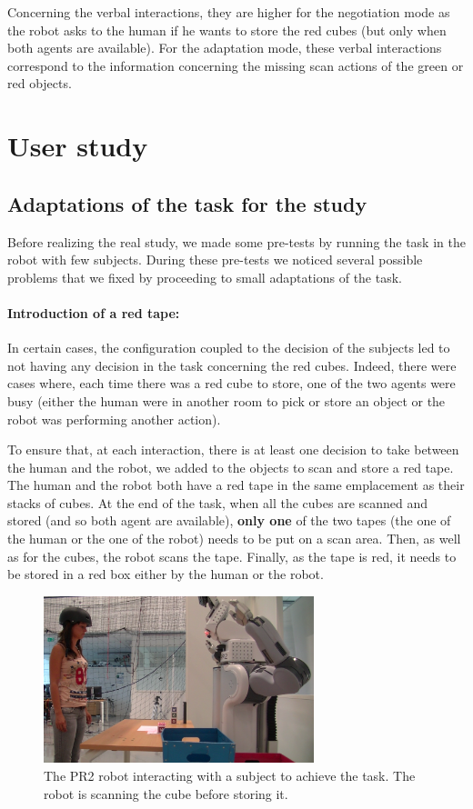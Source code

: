 \documentclass[english,a4paper,11pt,twoside]{StyleThese}
\begin{document}
Concerning the verbal interactions, they are higher for the negotiation mode as the robot asks to the human if he wants to store the red cubes (but only when both agents are available). For the adaptation mode, these verbal interactions correspond to the information concerning the missing scan actions of the green or red objects.

\section{User study}

\subsection{Adaptations of the task for the study}


Before realizing the real study, we made some pre-tests by running the task in the robot with few subjects. During these pre-tests we noticed several possible problems that we fixed by proceeding to small adaptations of the task.

\paragraph{Introduction of a red tape:}
In certain cases, the configuration coupled to the decision of the subjects led to not having any decision in the task concerning the red cubes. Indeed, there were cases where, each time there was a red cube to store, one of the two agents were busy (either the human were in another room to pick or store an object or the robot was performing another action). 

To ensure that, at each interaction, there is at least one decision to take between the human and the robot, we added to the objects to scan and store a red tape. The human and the robot both have a red tape in the same emplacement as their stacks of cubes. At the end of the task, when all the cubes are scanned and stored (and so both agent are available), \textbf{only one} of the two tapes (the one of the human or the one of the robot) needs to be put on a scan area. Then, as well as for the cubes, the robot scans the tape. Finally, as the tape is red, it needs to be stored in a red box either by the human or the robot.


\begin{figure}[!t]
	\centering
    \includegraphics[width=0.7\textwidth]{figs/Chapter5/Scan.png}
    \caption{The PR2 robot interacting with a subject to achieve the task. The robot is scanning the cube before storing it.}
    \label{fig:scan}
\end{figure}
\end{document}
